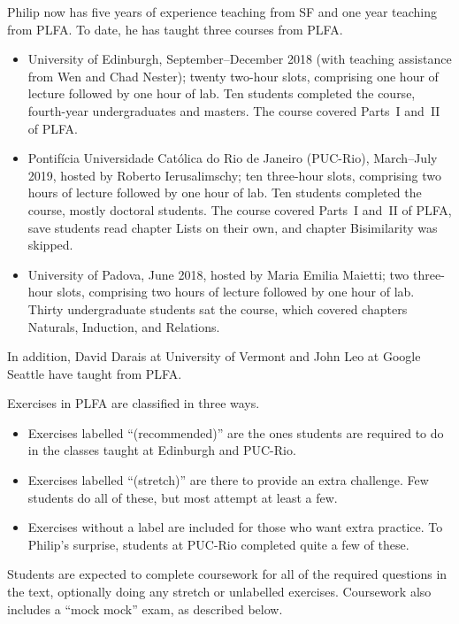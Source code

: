 \documentclass[preprint,authoryear]{elsarticle}
\begin{document}
Philip now has five years of experience teaching from SF and one year
teaching from PLFA.  To date, he has taught three courses from PLFA.
\begin{itemize}
\item
  University of Edinburgh, September--December 2018 (with teaching
  assistance from Wen and Chad Nester); twenty two-hour slots,
  comprising one hour of lecture followed by one hour of lab. Ten
  students completed the course, fourth-year undergraduates and
  masters.  The course covered Parts~I and~II of PLFA.

\item
  Pontifícia Universidade Católica do Rio de Janeiro (PUC-Rio),
  March--July 2019, hosted by Roberto Ierusalimschy; ten three-hour
  slots, comprising two hours of lecture followed by one hour of lab.
  Ten students completed the course, mostly doctoral students.  The
  course covered Parts~I and~II of PLFA, save students read chapter
  Lists on their own, and chapter Bisimilarity was skipped.

\item
  University of Padova, June 2018, hosted by Maria Emilia Maietti; two
  three-hour slots, comprising two hours of lecture followed by one
  hour of lab.  Thirty undergraduate students sat the course, which
  covered chapters Naturals, Induction, and Relations.
    
\end{itemize}
In addition, David Darais at University of Vermont and John Leo at
Google Seattle have taught from PLFA.

Exercises in PLFA are classified in three ways.
\begin{itemize}
\item
  Exercises labelled “(recommended)” are the ones students are
  required to do in the classes taught at Edinburgh and PUC-Rio.

\item
  Exercises labelled “(stretch)” are there to provide an extra
  challenge. Few students do all of these, but most attempt at least a
  few. 

\item   
  Exercises without a label are included for those who want extra
  practice.  To Philip's surprise, students at PUC-Rio completed
  quite a few of these.
\end{itemize}
Students are expected to complete coursework for all of the
required questions in the text, optionally doing any stretch or
unlabelled exercises. Coursework also includes a ``mock mock''
exam, as described below.
\end{document}
